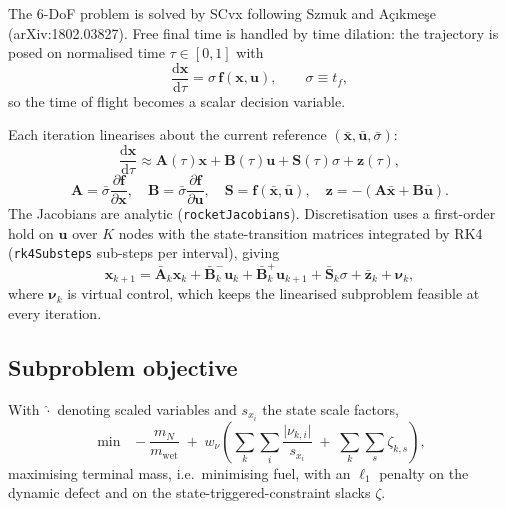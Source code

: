 \documentclass[11pt,a4paper]{article}
\newcommand{\vect}[1]{\mathbf{#1}}
\newcommand{\dd}{\mathrm{d}}
\newcommand{\code}[1]{\texttt{#1}}
\begin{document}
The 6-DoF problem is solved by SCvx following Szmuk and A\c{c}{\i}kme\c{s}e
(arXiv:1802.03827). Free final time is handled by time dilation: the trajectory
is posed on normalised time $\tau\in[0,1]$ with
\begin{equation}
\frac{\dd\vect{x}}{\dd\tau} = \sigma\, \vect{f}(\vect{x},\vect{u}),
\qquad \sigma \equiv t_f ,
\end{equation}
so the time of flight becomes a scalar decision variable.

Each iteration linearises about the current reference
$(\bar{\vect{x}},\bar{\vect{u}},\bar\sigma)$:
\begin{equation}
\frac{\dd\vect{x}}{\dd\tau} \approx
  \vect{A}(\tau)\vect{x} + \vect{B}(\tau)\vect{u} + \vect{S}(\tau)\sigma + \vect{z}(\tau),
\end{equation}
\begin{equation}
\vect{A}=\bar\sigma\frac{\partial \vect{f}}{\partial \vect{x}},\quad
\vect{B}=\bar\sigma\frac{\partial \vect{f}}{\partial \vect{u}},\quad
\vect{S}=\vect{f}(\bar{\vect{x}},\bar{\vect{u}}),\quad
\vect{z}=-\left(\vect{A}\bar{\vect{x}}+\vect{B}\bar{\vect{u}}\right).
\end{equation}
The Jacobians are analytic (\code{rocketJacobians}). Discretisation uses a
first-order hold on $\vect{u}$ over $K$ nodes with the state-transition matrices
integrated by RK4 (\code{rk4Substeps} sub-steps per interval), giving
\begin{equation}
\vect{x}_{k+1} = \bar{\vect{A}}_k\vect{x}_k
 + \bar{\vect{B}}^-_k\vect{u}_k + \bar{\vect{B}}^+_k\vect{u}_{k+1}
 + \bar{\vect{S}}_k\sigma + \bar{\vect{z}}_k + \boldsymbol{\nu}_k ,
\end{equation}
where $\boldsymbol{\nu}_k$ is virtual control, which keeps the linearised
subproblem feasible at every iteration.

\subsection{Subproblem objective}

With $\hat{\cdot}$ denoting scaled variables and $s_{x_i}$ the state scale
factors,
\begin{equation}
\min\;\; -\frac{m_N}{m_{\mathrm{wet}}}
 \;+\; w_\nu\left(\sum_{k}\sum_{i}\frac{\lvert\nu_{k,i}\rvert}{s_{x_i}}
 \;+\; \sum_{k}\sum_{s}\zeta_{k,s}\right),
\label{eq:objective}
\end{equation}
maximising terminal mass, i.e.\ minimising fuel, with an $\ell_1$ penalty on the
dynamic defect and on the state-triggered-constraint slacks $\zeta$.
\end{document}
